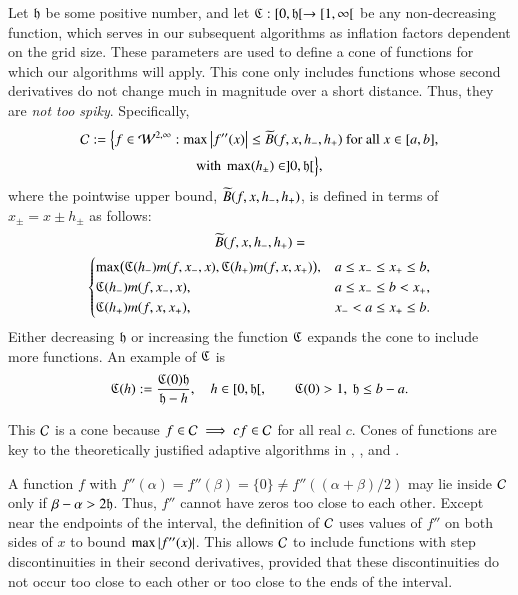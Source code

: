 \documentclass[review]{elsarticle}
\makeatletter
\newcommand{\Vast}{\bBigg@{6}}
\theoremstyle{definition}
\newcommand{\Vastr}{\mathclose\Vast}
\makeatother
\begin{document}
Let $\mathfrak{h}$ be some positive number, and let $\mathfrak{C} : [0,\mathfrak{h}[ \to [1,\infty[$ be any
non-decreasing function, which serves in our subsequent algorithms as inflation factors dependent on the grid size.
These parameters are used to define a cone of functions for which our algorithms will
apply.  This cone only includes functions whose second derivatives do not change much in
magnitude over a short distance.  Thus, they are \emph{not too spiky}.  Specifically,
\begin{multline} \label{conedef}
 \mathcal{C} :=   \Bigl \{
 f  \in    \mathcal{W}^{2,\infty}:   \max\left \lvert f''(x) \right \rvert  \le \widetilde{B}(f,x,h_-,h_+)  \text{ for all } x \in [a,b],
\\ \text{with }  \max(h_{\pm}) \in ]0, \mathfrak{h}[  \Bigr \},
\end{multline}
where the pointwise upper bound, $\widetilde{B}(f,x,h_-,h_+)$, is defined in terms of $x_{\pm} =x \pm h_{\pm}$ as follows:
\begin{multline*}
\tB(f,x,h_-,h_+)=\\
\begin{cases}
  \max\bigl(\fC(h_{-}) m(f,x_-,x),\fC(h_{+}) m(f,x,x_+)\bigr), & a \le x_- \le x_+ \le b,\\
\fC(h_{-}) m(f,x_-,x), & a \le x_- \le b <  x_+,\\
\fC(h_{+}) m(f,x,x_+), & x_- < a \le x_+ \le b.
\end{cases} %
\end{multline*}
Either decreasing $\mathfrak{h}$ or increasing the function $\mathfrak{C}$ expands the cone to include more functions.  An example of $\mathfrak{C}$ is
\begin{equation} \label{sampleC}
\mathfrak{C}(h) : = \frac{\mathfrak{C}(0) \mathfrak{h}}{\mathfrak{h} - h}, \quad h \in [0,\mathfrak{h}[, \qquad \mathfrak{C}(0) > 1,\ \mathfrak{h} \le b - a.
\end{equation}

This $\mathcal{C}$ is a cone because $f \in \mathcal{C} \implies cf \in \mathcal{C}$ for all real
$c$. Cones of
functions are key to the theoretically justified adaptive algorithms in
\cite{HicEtal14b}, \cite{Ton14a}, and \cite{Din15a}.

A function $f$ with $f''(\alpha) = f''(\beta) = \{0\} \ne f''((\alpha+\beta)/2)$ may
lie inside $\mathcal{C}$ only if $\beta - \alpha > 2\mathfrak{h}$. Thus, $f''$ cannot have zeros too close to each other.  Except near the endpoints of
the interval, the definition of $\mathcal{C}$ uses values of $f''$ on both sides of $x$
to bound $\max \left \lvert f''(x) \right \rvert$. This allows $\mathcal{C}$ to include functions with step
discontinuities in their second derivatives, provided that these discontinuities
do not occur too close to each other or too close to the ends of the interval.
\end{document}
